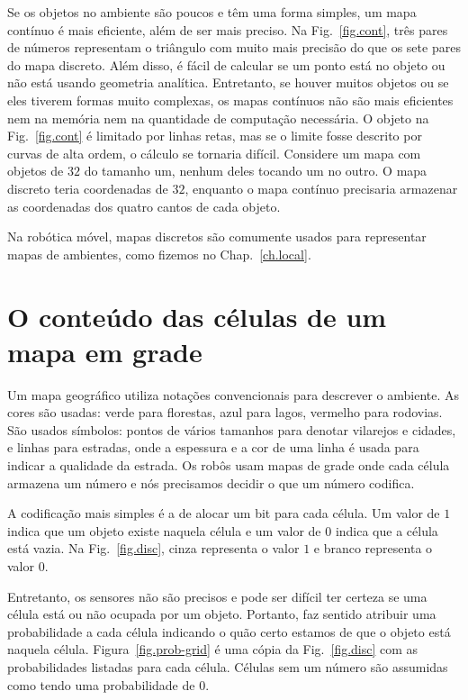 Se os objetos no ambiente são poucos e têm uma forma simples, um mapa contínuo é mais eficiente, além de ser mais preciso. Na Fig.~\ref{fig.cont}, três pares de números representam o triângulo com muito mais precisão do que os sete pares do mapa discreto. Além disso, é fácil de calcular se um ponto está no objeto ou não está usando geometria analítica. Entretanto, se houver muitos objetos ou se eles tiverem formas muito complexas, os mapas contínuos não são mais eficientes nem na memória nem na quantidade de computação necessária. O objeto na Fig.~\ref{fig.cont} é limitado por linhas retas, mas se o limite fosse descrito por curvas de alta ordem, o cálculo se tornaria difícil. Considere um mapa com objetos de $32$ do tamanho um, nenhum deles tocando um no outro. O mapa discreto teria coordenadas de $32$, enquanto o mapa contínuo precisaria armazenar as coordenadas dos quatro cantos de cada objeto.

Na robótica móvel, mapas discretos são comumente usados para representar mapas de ambientes, como fizemos no Chap.~\ref{ch.local}.

\section{O conteúdo das células de um mapa em grade}\label{s.grids}

Um mapa geográfico utiliza notações convencionais para descrever o ambiente. As cores são usadas: verde para florestas, azul para lagos, vermelho para rodovias. São usados símbolos: pontos de vários tamanhos para denotar vilarejos e cidades, e linhas para estradas, onde a espessura e a cor de uma linha é usada para indicar a qualidade da estrada. Os robôs usam mapas de grade onde cada célula armazena um número e nós precisamos decidir o que um número codifica.

A codificação mais simples é a de alocar um bit para cada célula. Um valor de $1$ indica que um objeto existe naquela célula e um valor de $0$ indica que a célula está vazia. Na Fig.~\ref{fig.disc}, cinza representa o valor $1$ e branco representa o valor $0$.

Entretanto, os sensores não são precisos e pode ser difícil ter certeza se uma célula está ou não ocupada por um objeto. Portanto, faz sentido atribuir uma probabilidade a cada célula indicando o quão certo estamos de que o objeto está naquela célula. Figura~\ref{fig.prob-grid} é uma cópia da Fig.~\ref{fig.disc} com as probabilidades listadas para cada célula. Células sem um número são assumidas como tendo uma probabilidade de $0$.

